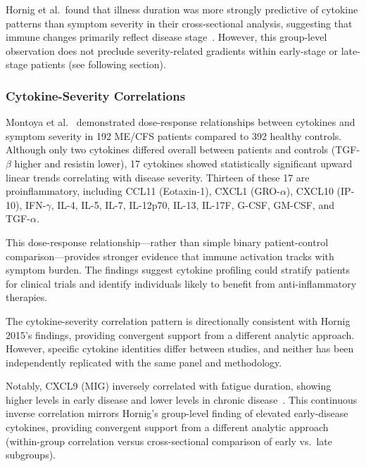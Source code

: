 Hornig et al.\ found that illness duration was more strongly predictive of cytokine patterns than symptom severity in their cross-sectional analysis, suggesting that immune changes primarily reflect disease stage~\cite{Hornig2015}. However, this group-level observation does not preclude severity-related gradients within early-stage or late-stage patients (see following section).

\subsubsection{Cytokine-Severity Correlations}

\begin{achievement}
\label{ach:cytokine-severity}
Montoya et al.~\cite{Montoya2017} demonstrated dose-response relationships between cytokines and symptom severity in 192 ME/CFS patients compared to 392 healthy controls. Although only two cytokines differed overall between patients and controls (TGF-$\beta$ higher and resistin lower), 17 cytokines showed statistically significant upward linear trends correlating with disease severity. Thirteen of these 17 are proinflammatory, including CCL11 (Eotaxin-1), CXCL1 (GRO-$\alpha$), CXCL10 (IP-10), IFN-$\gamma$, IL-4, IL-5, IL-7, IL-12p70, IL-13, IL-17F, G-CSF, GM-CSF, and TGF-$\alpha$.

This dose-response relationship---rather than simple binary patient-control comparison---provides stronger evidence that immune activation tracks with symptom burden. The findings suggest cytokine profiling could stratify patients for clinical trials and identify individuals likely to benefit from anti-inflammatory therapies.
\end{achievement}

\begin{warning}
The cytokine-severity correlation pattern is directionally consistent with Hornig 2015's findings, providing convergent support from a different analytic approach. However, specific cytokine identities differ between studies, and neither has been independently replicated with the same panel and methodology.
\end{warning}

Notably, CXCL9 (MIG) inversely correlated with fatigue duration, showing higher levels in early disease and lower levels in chronic disease~\cite{Montoya2017}. This continuous inverse correlation mirrors Hornig's group-level finding of elevated early-disease cytokines, providing convergent support from a different analytic approach (within-group correlation versus cross-sectional comparison of early vs.\ late subgroups).

